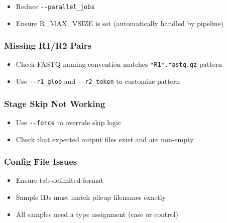 \documentclass[
]{article}
\providecommand{\tightlist}{%
  \setlength{\itemsep}{0pt}\setlength{\parskip}{0pt}}
\begin{document}
\begin{itemize}
\tightlist
\item
  Reduce \texttt{-\/-parallel\_jobs}
\item
  Ensure R\_MAX\_VSIZE is set (automatically handled by pipeline)
\end{itemize}

\subsubsection{Missing R1/R2 Pairs}\label{missing-r1r2-pairs}

\begin{itemize}
\tightlist
\item
  Check FASTQ naming convention matches \texttt{*R1*.fastq.gz} pattern
\item
  Use \texttt{-\/-r1\_glob} and \texttt{-\/-r2\_token} to customize
  pattern
\end{itemize}

\subsubsection{Stage Skip Not Working}\label{stage-skip-not-working}

\begin{itemize}
\tightlist
\item
  Use \texttt{-\/-force} to override skip logic
\item
  Check that expected output files exist and are non-empty
\end{itemize}

\subsubsection{Config File Issues}\label{config-file-issues}

\begin{itemize}
\tightlist
\item
  Ensure tab-delimited format
\item
  Sample IDs must match pileup filenames exactly
\item
  All samples need a type assignment (case or control)
\end{itemize}
\end{document}

